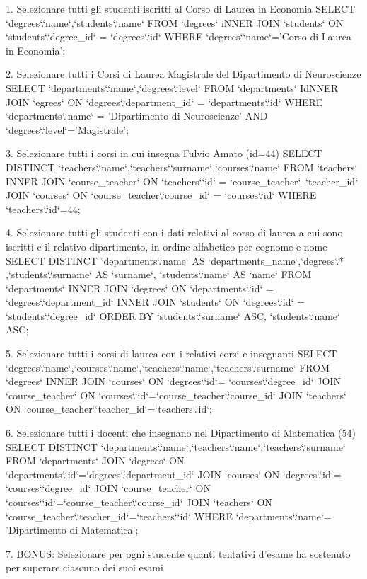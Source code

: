 1. Selezionare tutti gli studenti iscritti al Corso di Laurea in Economia
SELECT `degrees`.`name`,`students`.`name` FROM `degrees` iNNER JOIN `students` ON `students`.`degree_id` = `degrees`.`id` WHERE `degrees`.`name`='Corso di Laurea in Economia';


2. Selezionare tutti i Corsi di Laurea Magistrale del Dipartimento di Neuroscienze
SELECT `departments`.`name`,`degrees`.`level` FROM `departments` IdNNER JOIN `egrees` ON `degrees`.`department_id` = `departments`.`id` WHERE `departments`.`name` = 'Dipartimento di Neuroscienze' AND `degrees`.`level`='Magistrale';

3. Selezionare tutti i corsi in cui insegna Fulvio Amato (id=44)
SELECT DISTINCT `teachers`.`name`,`teachers`.`surname`,`courses`.`name` FROM `teachers` INNER JOIN `course_teacher` ON `teachers`.`id` = `course_teacher`. `teacher_id` JOIN `courses` ON `course_teacher`.`course_id` = `courses`.`id` WHERE `teachers`.`id`=44;

4. Selezionare tutti gli studenti con i dati relativi al corso di laurea a cui sono iscritti e il
relativo dipartimento, in ordine alfabetico per cognome e nome
SELECT DISTINCT `departments`.`name` AS `departments_name`,`degrees`.* ,`students`.`surname` AS `surname`, `students`.`name` AS `name` FROM `departments` INNER JOIN `degrees` ON `departments`.`id` = `degrees`.`department_id` INNER JOIN `students` ON `degrees`.`id` = `students`.`degree_id` ORDER BY `students`.`surname` ASC, `students`.`name` ASC;

5. Selezionare tutti i corsi di laurea con i relativi corsi e insegnanti
SELECT `degrees`.`name`,`courses`.`name`,`teachers`.`name`,`teachers`.`surname` FROM `degrees` INNER JOIN `courses` ON `degrees`.`id`= `courses`.`degree_id` JOIN `course_teacher` ON `courses`.`id`=`course_teacher`.`course_id` JOIN `teachers` ON `course_teacher`.`teacher_id`=`teachers`.`id`;


6. Selezionare tutti i docenti che insegnano nel Dipartimento di Matematica (54)
SELECT DISTINCT `departments`.`name`,`teachers`.`name`,`teachers`.`surname` FROM `departments` JOIN `degrees` ON `departments`.`id`=`degrees`.`department_id` JOIN `courses` ON `degrees`.`id`= `courses`.`degree_id` JOIN `course_teacher` ON `courses`.`id`=`course_teacher`.`course_id` JOIN `teachers` ON `course_teacher`.`teacher_id`=`teachers`.`id` WHERE `departments`.`name`= 'Dipartimento di Matematica';


7. BONUS: Selezionare per ogni studente quanti tentativi d’esame ha sostenuto per
superare ciascuno dei suoi esami